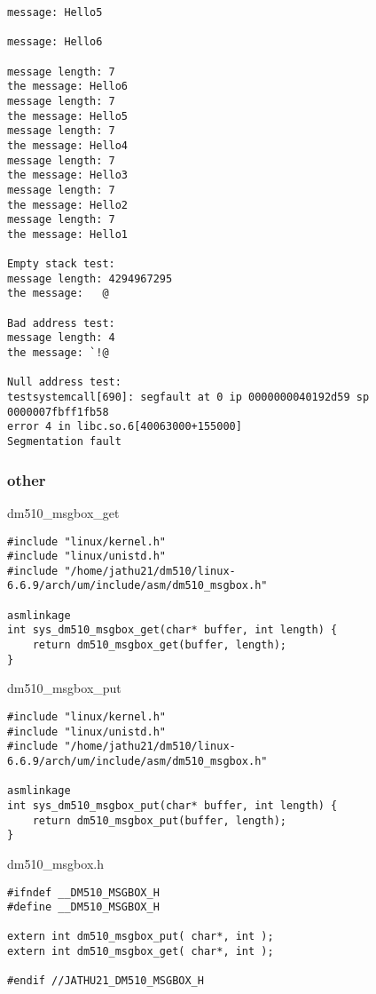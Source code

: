 \documentclass[12pt,a4paper]{report}
\begin{document}
\begin{verbatim}
message: Hello5

message: Hello6

message length: 7
the message: Hello6
message length: 7
the message: Hello5
message length: 7
the message: Hello4
message length: 7
the message: Hello3
message length: 7
the message: Hello2
message length: 7
the message: Hello1

Empty stack test:
message length: 4294967295
the message:   @

Bad address test:
message length: 4
the message: `!@

Null address test:
testsystemcall[690]: segfault at 0 ip 0000000040192d59 sp 0000007fbff1fb58 
error 4 in libc.so.6[40063000+155000]
Segmentation fault

\end{verbatim}
\subsubsection{other} \label{otherCode}
dm510\_msgbox\_get
\begin{verbatim}
#include "linux/kernel.h"
#include "linux/unistd.h"
#include "/home/jathu21/dm510/linux-6.6.9/arch/um/include/asm/dm510_msgbox.h"

asmlinkage
int sys_dm510_msgbox_get(char* buffer, int length) {
    return dm510_msgbox_get(buffer, length);
}
\end{verbatim}
dm510\_msgbox\_put
\begin{verbatim}
#include "linux/kernel.h"
#include "linux/unistd.h"
#include "/home/jathu21/dm510/linux-6.6.9/arch/um/include/asm/dm510_msgbox.h"

asmlinkage
int sys_dm510_msgbox_put(char* buffer, int length) {
    return dm510_msgbox_put(buffer, length);
}
\end{verbatim}
dm510\_msgbox.h
\begin{verbatim}
#ifndef __DM510_MSGBOX_H
#define __DM510_MSGBOX_H

extern int dm510_msgbox_put( char*, int );
extern int dm510_msgbox_get( char*, int );

#endif //JATHU21_DM510_MSGBOX_H
\end{verbatim}
\end{document}
